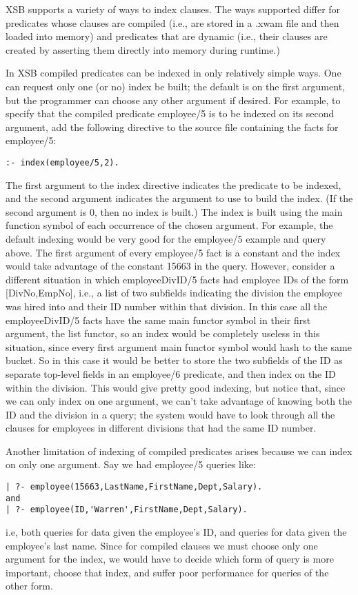 XSB supports a variety of ways to index clauses.  The ways supported
differ for predicates whose clauses are compiled (i.e., are stored in
a .xwam file and then loaded into memory) and predicates that are
dynamic (i.e., their clauses are created by asserting them directly
into memory during runtime.)

In XSB compiled predicates can be indexed in only relatively simple
ways.  One can request only one (or no) index be built; the default is
on the first argument, but the programmer can choose any other
argument if desired.  For example, to specify that the compiled
predicate employee/5 is to be indexed on its second argument, add the
following directive to the source file containing the facts for
employee/5:
\begin{verbatim}
:- index(employee/5,2).
\end{verbatim}
The first argument to the index directive indicates the predicate to
be indexed, and the second argument indicates the argument to use to
build the index.  (If the second argument is 0, then no index is
built.)  The index is built using the main function symbol of each
occurrence of the chosen argument.  For example, the default indexing
would be very good for the employee/5 example and query above.  The
first argument of every employee/5 fact is a constant and the index
would take advantage of the constant 15663 in the query.  However,
consider a different situation in which employeeDivID/5 facts had
employee IDs of the form [DivNo,EmpNo], i.e., a list of two subfields
indicating the division the employee was hired into and their ID
number within that division.  In this case all the employeeDivID/5
facts have the same main functor symbol in their first argument, the
list functor, so an index would be completely useless in this
situation, since every first argument main functor symbol would hash
to the same bucket.  So in this case it would be better to store the
two subfields of the ID as separate top-level fields in an employee/6
predicate, and then index on the ID within the division.  This would
give pretty good indexing, but notice that, since we can only index on
one argument, we can't take advantage of knowing both the ID and the
division in a query; the system would have to look through all the
clauses for employees in different divisions that had the same ID
number.

Another limitation of indexing of compiled predicates arises because
we can index on only one argument.  Say we had employee/5 queries
like:
\begin{verbatim}
| ?- employee(15663,LastName,FirstName,Dept,Salary).
and
| ?- employee(ID,'Warren',FirstName,Dept,Salary).
\end{verbatim}
i.e, both queries for data given the employee's ID, and queries for
data given the employee's last name.  Since for compiled clauses we
must choose only one argument for the index, we would have to decide
which form of query is more important, choose that index, and suffer
poor performance for queries of the other form.

